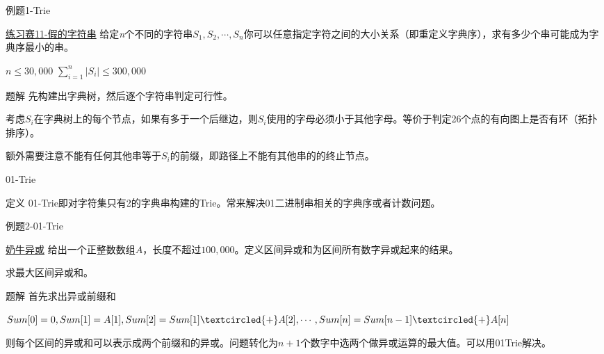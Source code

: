 \documentclass{ctexbeamer}		%
\begin{document}
\begin{frame}{例题1-Trie}

\begin{block}{\href{https://ac.nowcoder.com/acm/contest/59/B}{练习赛11-假的字符串}}
给定\textit{n}个不同的字符串$S_1, S_2, \cdots,S_n$你可以任意指定字符之间的大小关系（即重定义字典序），求有多少个串可能成为字典序最小的串。

$n \leq 30, 000$ \hspace{4} $\sum_{i=1}^{n}|S_i| \leq 300, 000$
\end{block}

\pause

\begin{block}{题解}
先构建出字典树，然后逐个字符串判定可行性。

\pause

考虑$S_i$在字典树上的每个节点，如果有多于一个后继边，则$S_i$使用的字母必须小于其他字母。等价于判定26个点的有向图上是否有环（拓扑排序）。

\pause
额外需要注意不能有任何其他串等于$S_i$的前缀，即路径上不能有其他串的的终止节点。
\end{block}
\end{frame}

\begin{frame}{01-Trie}
\begin{block}{定义}
01-Trie即对字符集只有2的字典串构建的Trie。常来解决01二进制串相关的字典序或者计数问题。
\end{block}

\end{frame}

\begin{frame}{例题2-01-Trie}
    
\begin{block}{\href{https://ac.nowcoder.com/acm/problem/22998}{奶牛异或}}
给出一个正整数数组$A$，长度不超过$100,000$。定义区间异或和为区间所有数字异或起来的结果。

求最大区间异或和。
\end{block}

\pause
\begin{block}{题解}
首先求出异或前缀和

$Sum[0] = 0, Sum[1] = A[1], Sum[2] = Sum[1] \textcircled{+} A[2], \cdots, Sum[n] = Sum[n-1] \textcircled{+} A[n]$

则每个区间的异或和可以表示成两个前缀和的异或。问题转化为$n+1$个数字中选两个做异或运算的最大值。可以用01Trie解决。
\end{block}
\end{frame}
\end{document}
